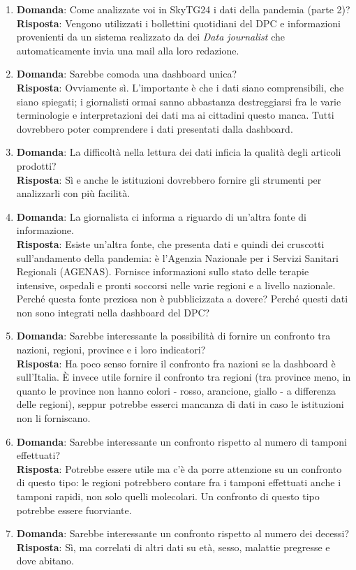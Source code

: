 \begin{enumerate}
    \item \textbf{Domanda}: Come analizzate voi in SkyTG24 i dati della pandemia (parte 2)?\\\textbf{Risposta}: Vengono utilizzati i bollettini quotidiani del DPC e informazioni provenienti da un sistema realizzato da dei \textit{Data journalist} che automaticamente invia una mail alla loro redazione.
    \item \textbf{Domanda}: Sarebbe comoda una dashboard unica?\\\textbf{Risposta}: Ovviamente sì. L'importante è che i dati siano comprensibili, che siano spiegati; i giornalisti ormai sanno abbastanza destreggiarsi fra le varie terminologie e interpretazioni dei dati ma ai cittadini questo manca. Tutti dovrebbero poter comprendere i dati presentati dalla dashboard.
    \item \textbf{Domanda}: La difficoltà nella lettura dei dati inficia la qualità degli articoli prodotti?\\\textbf{Risposta}: Sì e anche le istituzioni dovrebbero fornire gli strumenti per analizzarli con più facilità.
    \item \textbf{Domanda}: La giornalista ci informa a riguardo di un'altra fonte di informazione.\\\textbf{Risposta}: Esiste un'altra fonte, che presenta dati e quindi dei cruscotti sull'andamento della pandemia: è l'Agenzia Nazionale per i Servizi Sanitari Regionali (AGENAS). Fornisce informazioni sullo stato delle terapie intensive, ospedali e pronti soccorsi nelle varie regioni e a livello nazionale. Perché questa fonte preziosa non è pubblicizzata a dovere? Perché questi dati non sono integrati nella dashboard del DPC?
    \item \textbf{Domanda}: Sarebbe interessante la possibilità di fornire un confronto tra nazioni, regioni, province e i loro indicatori?\\\textbf{Risposta}: Ha poco senso fornire il confronto fra nazioni se la dashboard è sull'Italia. È invece utile fornire il confronto tra regioni (tra province meno, in quanto le province non hanno colori - rosso, arancione, giallo - a differenza delle regioni), seppur potrebbe esserci mancanza di dati in caso le istituzioni non li forniscano.
    \item \textbf{Domanda}: Sarebbe interessante un confronto rispetto al numero di tamponi effettuati?\\\textbf{Risposta}: Potrebbe essere utile ma c'è da porre attenzione su un confronto di questo tipo: le regioni potrebbero contare fra i tamponi effettuati anche i tamponi rapidi, non solo quelli molecolari. Un confronto di questo tipo potrebbe essere fuorviante.
    \item \textbf{Domanda}: Sarebbe interessante un confronto rispetto al numero dei decessi?\\\textbf{Risposta}: Sì, ma correlati di altri dati su età, sesso, malattie pregresse e dove abitano.
\end{enumerate}


